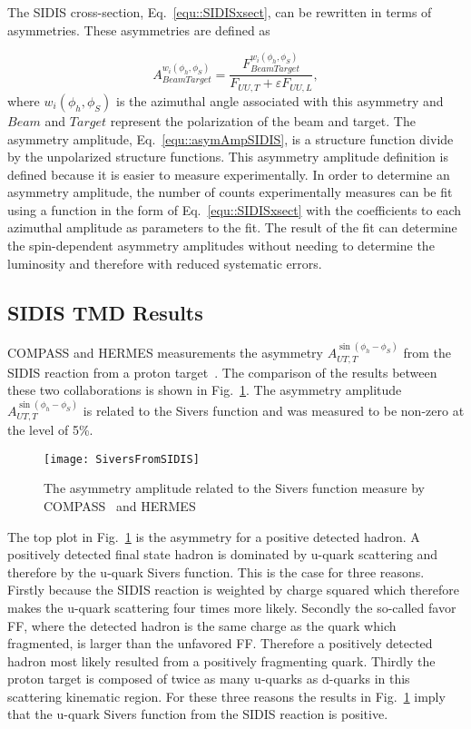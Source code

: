 The SIDIS cross-section, Eq.~\ref{equ::SIDISxsect}, can be rewritten in terms of
asymmetries.  These asymmetries are defined as

\begin{equation}
  A^{w_i(\phi_h, \phi_S)}_{BeamTarget} = \frac{F^{w_i(\phi_h,
      \phi_S)}_{BeamTarget}}{F_{UU,T}+\varepsilon F_{UU,L}},
  \label{equ::asymAmpSIDIS}
\end{equation}
\noindent
where $w_i(\phi_h, \phi_S)$ is the azimuthal angle associated with this
asymmetry and $Beam$ and $Target$ represent the polarization of the beam and
target.  The asymmetry amplitude, Eq.~\ref{equ::asymAmpSIDIS}, is a structure
function divide by the unpolarized structure functions.  This asymmetry
amplitude definition is defined because it is easier to measure experimentally.
In order to determine an asymmetry amplitude, the number of counts
experimentally measures can be fit using a function in the form of
Eq.~\ref{equ::SIDISxsect} with the coefficients to each azimuthal amplitude as
parameters to the fit.  The result of the fit can determine the spin-dependent
asymmetry amplitudes without needing to determine the luminosity and therefore
with reduced systematic errors.

\subsection{SIDIS TMD Results}
COMPASS and HERMES measurements the asymmetry $A_{UT ,T}^{\sin\left(\phi_h
  -\phi_S\right)}$ from the SIDIS reaction from a proton
target~\cite{Alekseev:2008aa,Airapetian:2009ae}.  The comparison of the results
between these two collaborations is shown in Fig.~\ref{fig::SiversFromSIDIS}.
The asymmetry amplitude $A_{UT ,T}^{\sin\left(\phi_h-\phi_S\right)}$ is related
to the Sivers function and was measured to be non-zero at the level of 5\%.

\begin{figure}[h!t]
  \centering \texttt{[image: SiversFromSIDIS]}
  \caption{The asymmetry amplitude related to the Sivers function measure by
    COMPASS~\cite{Alekseev:2008aa} and HERMES~\cite{Airapetian:2009ae}}
  \label{fig::SiversFromSIDIS}
\end{figure}

The top plot in Fig.~\ref{fig::SiversFromSIDIS} is the asymmetry for a positive
detected hadron.  A positively detected final state hadron is dominated by
u-quark scattering and therefore by the u-quark Sivers function.  This is the
case for three reasons.  Firstly because the SIDIS reaction is weighted by
charge squared which therefore makes the u-quark scattering four times more
likely.  Secondly the so-called favor FF, where the detected hadron is the same
charge as the quark which fragmented, is larger than the unfavored FF.
Therefore a positively detected hadron most likely resulted from a positively
fragmenting quark.  Thirdly the proton target is composed of twice as many
u-quarks as d-quarks in this scattering kinematic region.  For these three
reasons the results in Fig.~\ref{fig::SiversFromSIDIS} imply that the u-quark
Sivers function from the SIDIS reaction is positive.

